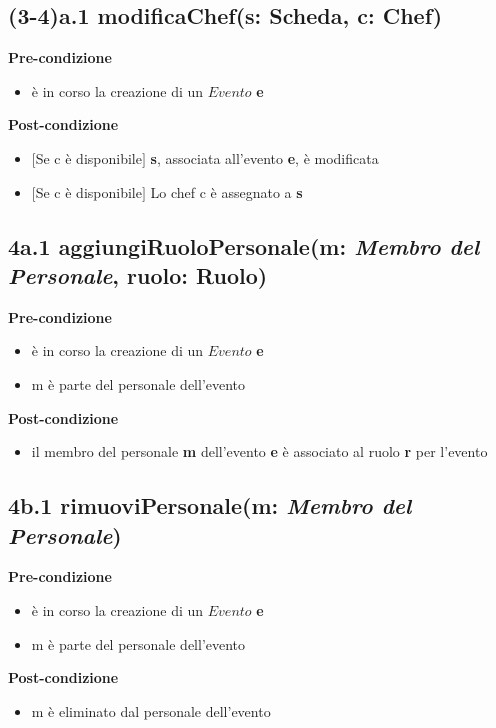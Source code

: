 \documentclass[12pt]{extarticle}
\begin{document}
\subsection*{(3-4)a.1 modificaChef(s: Scheda, c: Chef)}
\textbf{Pre-condizione}
\begin{itemize}
  \item è in corso la creazione di un $Evento$ \textbf{e}
\end{itemize} 
\textbf{Post-condizione}
\begin{itemize}
  \item $[$Se c è disponibile$]$ \textbf{s}, associata all'evento \textbf{e}, è modificata
  \item $[$Se c è disponibile$]$ Lo chef c è assegnato a \textbf{s}
\end{itemize}


\subsection*{4a.1 aggiungiRuoloPersonale(m: \textit{Membro del Personale}, ruolo: Ruolo)}
\textbf{Pre-condizione}
\begin{itemize}
  \item è in corso la creazione di un $Evento$ \textbf{e}
  \item m è parte del personale dell'evento
\end{itemize}
\textbf{Post-condizione}
\begin{itemize}
  \item il membro del personale \textbf{m} dell'evento \textbf{e} è associato al ruolo \textbf{r} per l'evento
\end{itemize}


\subsection*{4b.1 rimuoviPersonale(m: \textit{Membro del Personale})}
\textbf{Pre-condizione}
\begin{itemize}
  \item è in corso la creazione di un $Evento$ \textbf{e}
  \item m è parte del personale dell'evento
\end{itemize}
\textbf{Post-condizione}
\begin{itemize}
  \item m è eliminato dal personale dell'evento
\end{itemize}
\end{document}
